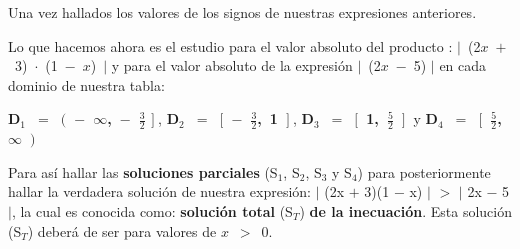 \documentclass[12pt]{article}
\begin{document}
\begin{table}[H]
\begin{tabular}{ | p{3cm}| p{1.5cm} | p{1.5cm} | p{1.5cm} | p{1.5cm}|}
\hline
\end{tabular}
\end{table} \vspace{0.2cm}

\newpage


Una vez hallados los valores de los signos de nuestras expresiones anteriores. \vspace{0.5cm}

Lo que hacemos ahora es el estudio para el valor absoluto del producto : \mbox{$\mid$ (2$x$ $+$ 3) $\cdot$ (1 $-$ $x$) $\mid$} y para el valor absoluto de la expresión \mbox{$\mid$ (2$x$ $-$ 5)} $\mid$ en cada dominio de nuestra tabla: \vspace{0.5cm}


{\bfseries{{\textcolor{Burnt Sienna}{\mbox{D$_{1}$ $=$ {$\Big($} $-$ $\infty$, $-$ {\Large{$\frac{3}{2}$}}} {$\Big ]\ $}}}}}, {\bfseries{{\textcolor{Burnt Sienna}{\mbox{D$_{2}$ $=$ {$\Big[$}  $-$ {\Large{$\frac{3}{2}$}}, 1 {$\Big ]\ $}}}}}}, {\bfseries{{\textcolor{Burnt Sienna}{\mbox{D$_{3}$ $=$ {$\Big[$}  1, {\Large{$\frac{5}{2}$}} {$\Big ]\ $}}}}}} y \hspace{0.1cm} {\bfseries{{\textcolor{Burnt Sienna}{\mbox{D$_{4}$ $=$ {$\Big[$}  {\Large{$\frac{5}{2}$}}, $\infty$ {$\Big )\ $}}}}}} \vspace{0.5cm}


Para así hallar las {\bfseries{soluciones parciales}} (S$_{1}$, S$_{2}$, S$_{3}$ y S$_{4}$) para posteriormente hallar la verdadera solución de nuestra expresión: $\mid$ (2x $+$ 3)(1 $-$ x) $\mid$ $>$ $\mid$ 2x $-$ 5 $\mid$, la cual es conocida como: {\bfseries{solución total}} (S$_{T}$) {\bfseries{de la inecuación}}. Esta solución (S$_{T}$) deberá de ser para valores de \mbox{$x$ $>$ $0$}. \vspace{0.5cm}
\end{document}
